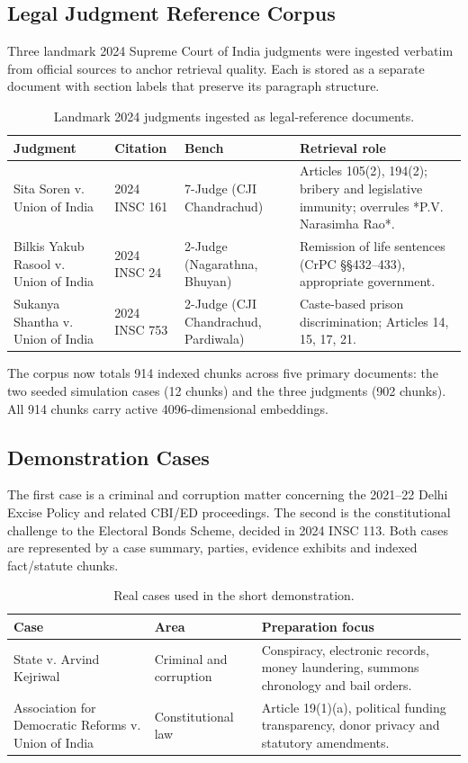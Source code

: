 \documentclass[12pt]{article}
\begin{document}
\subsection{Legal Judgment Reference Corpus}
Three landmark 2024 Supreme Court of India judgments were ingested verbatim from official sources to anchor retrieval quality. Each is stored as a separate document with section labels that preserve its paragraph structure.

\begin{table}[!htbp]
\centering
\caption{Landmark 2024 judgments ingested as legal-reference documents.}
\label{tab:judgments}
\begin{tabularx}{0.95\textwidth}{p{}p{}p{}X}
\toprule
Judgment & Citation & Bench & Retrieval role \\
\midrule
Sita Soren v. Union of India & 2024 INSC 161 & 7-Judge (CJI Chandrachud) & Articles 105(2), 194(2); bribery and legislative immunity; overrules *P.V. Narasimha Rao*. \\
Bilkis Yakub Rasool v. Union of India & 2024 INSC 24 & 2-Judge (Nagarathna, Bhuyan) & Remission of life sentences (CrPC §§432--433), appropriate government. \\
Sukanya Shantha v. Union of India & 2024 INSC 753 & 2-Judge (CJI Chandrachud, Pardiwala) & Caste-based prison discrimination; Articles 14, 15, 17, 21. \\
\bottomrule
\end{tabularx}
\end{table}

The corpus now totals 914 indexed chunks across five primary documents: the two seeded simulation cases (12 chunks) and the three judgments (902 chunks). All 914 chunks carry active 4096-dimensional embeddings.

\subsection{Demonstration Cases}
The first case is a criminal and corruption matter concerning the 2021--22 Delhi Excise Policy and related CBI/ED proceedings. The second is the constitutional challenge to the Electoral Bonds Scheme, decided in 2024 INSC 113. Both cases are represented by a case summary, parties, evidence exhibits and indexed fact/statute chunks.
\begin{table}[!htbp]\centering\caption{Real cases used in the short demonstration.}\label{tab:cases}\begin{tabularx}{0.95\textwidth}{p{}p{}X}\toprule Case & Area & Preparation focus \\ \midrule State v. Arvind Kejriwal & Criminal and corruption & Conspiracy, electronic records, money laundering, summons chronology and bail orders. \\ Association for Democratic Reforms v. Union of India & Constitutional law & Article 19(1)(a), political funding transparency, donor privacy and statutory amendments. \\ \bottomrule\end{tabularx}\end{table}
\end{document}
